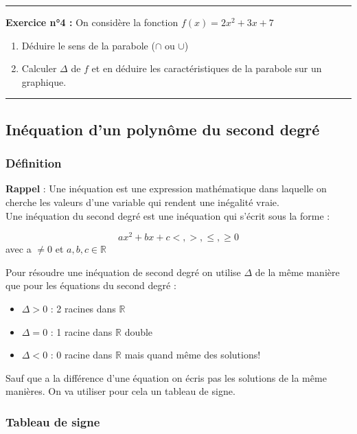 \documentclass{article}
\begin{document}
	\rule{\textwidth}{0.4pt}
	\noindent \textbf{Exercice n°4 :}
	On considère la fonction $f(x) = 2x^2 + 3x + 7$
	\begin{enumerate}
	\item Déduire le sens de la parabole ($\cap$ ou $\cup$)
	\item Calculer $\Delta$ de $f$ et en déduire les caractéristiques de la parabole sur un graphique.
	\end{enumerate}
	
	\rule{\textwidth}{0.4pt}
	
	\subsection{Inéquation d'un polynôme du second degré}
	\subsubsection{Définition}
	\textbf{Rappel} : Une inéquation est une expression mathématique dans laquelle on cherche les valeurs d'une variable qui rendent une inégalité vraie.\\
	
	\noindent Une inéquation du second degré est une inéquation qui s'écrit sous la forme :
	
	\[
		ax^2 + bx + c <, >, \leq, \geq 0
	\]
	avec a $\neq 0$ et $a,b,c \in \mathbb{R}$ \\
	
	\newpage
	
	\noindent Pour résoudre une inéquation de second degré on utilise $\Delta$ de la même manière que pour les équations du second degré :
	
	\begin{itemize}
		\item $\Delta > 0$ : 2 racines dans $\mathbb{R}$
		\item $\Delta = 0$ : 1 racine dans $\mathbb{R}$ double
		\item $\Delta < 0$ : 0 racine dans $\mathbb{R}$ mais quand même des solutions!\\
	\end{itemize}
	
	\noindent Sauf que a la différence d'une équation on écris pas les solutions de la même manières. On va utiliser pour cela un tableau de signe.
	
	\subsubsection{Tableau de signe}
	
\end{document}
